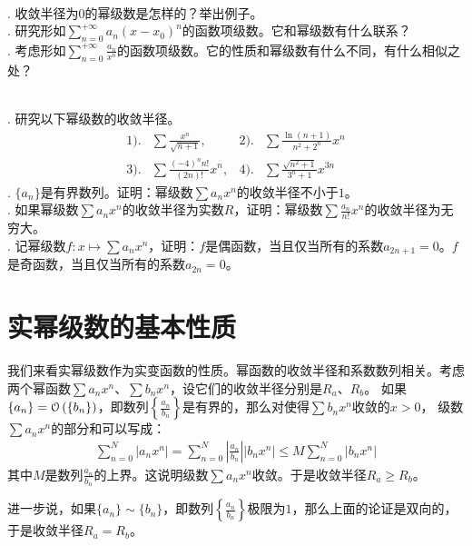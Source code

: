 \documentclass[12pt,UTF8]{ctexbook}
\begin{document}
\begin{sk}
    \mbox{} \\
    . 收敛半径为$0$的幂级数是怎样的？举出例子。 \\
    . 研究形如$\sum_{n=0}^{+\infty} a_n (x - x_0)^n$的函数项级数。它和幂级数有什么联系？\\
    . 考虑形如$\sum_{n=0}^{+\infty} \frac{a_n}{x^n}$的函数项级数。它的性质和幂级数有什么不同，有什么相似之处？
\end{sk}

\begin{xt}    
    \mbox{} \\
    . 研究以下幂级数的收敛半径。\\
    \begin{align*}
        1).& \sum \frac{x^n}{\sqrt{n+1}} ,  &2).& \sum \frac{\ln{(n+1)}}{n^2 + 2^n} x^n \\
        3).& \sum \frac{(-4)^n n!}{(2n)!} x^n,  & 4).& \sum \frac{\sqrt{n^2+1}}{3^n+1} x^{3n} 
    \end{align*}
    . $\{a_n\}$是有界数列。证明：幂级数$\sum a_n x^n$的收敛半径不小于$1$。\\
    . 如果幂级数$\sum a_n x^n$的收敛半径为实数$R$，证明：幂级数$\sum \frac{a_n}{n!} x^n$的收敛半径为无穷大。\\
    . 记幂级数$f: x\mapsto \sum a_n x^n $，证明：$f$是偶函数，当且仅当所有的系数$a_{2n+1} = 0$。$f$是奇函数，当且仅当所有的系数$a_{2n} = 0$。
\end{xt}

\section{实幂级数的基本性质}

我们来看实幂级数作为实变函数的性质。幂函数的收敛半径和系数数列相关。考虑两个幂函数$\sum a_n x^n$、$\sum b_n x^n$，设它们的收敛半径分别是$R_a$、$R_b$。
如果$\{a_n\} = \mathcal{O}\left(\{b_n\}\right)$，即数列$\left\{\frac{a_n}{b_n}\right\}$是有界的，那么对使得$\sum b_n x^n$收敛的$x>0$，
级数$\sum a_n x^n$的部分和可以写成：
\begin{align*}
    \sum_{n=0}^{N} |a_n x^n| = \sum_{n=0}^{N} \left|\frac{a_n}{b_n}\right| |b_n x^n| \leqslant M \sum_{n=0}^{N} |b_n x^n|
\end{align*}
其中$M$是数列$\frac{a_n}{b_n}$的上界。这说明级数$\sum a_n x^n$收敛。于是收敛半径$R_a \geqslant R_b$。

进一步说，如果$\{a_n\} \sim \{b_n\}$，即数列$\left\{\frac{a_n}{b_n}\right\}$极限为$1$，那么上面的论证是双向的，于是收敛半径$R_a = R_b$。
\end{document}
